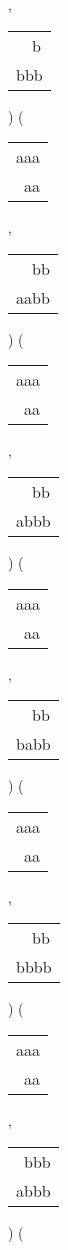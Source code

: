 \begin{description}
 , 
\begin{tabular}{|l|} \hline
\ \ b \\
bbb \\
\hline
\end{tabular} 
) 
 ( 
\begin{tabular}{|l|} \hline
aaa \\
\ aa \\
\hline
\end{tabular} 
 , 
\begin{tabular}{|l|} \hline
\ \ bb \\
aabb \\
\hline
\end{tabular} 
) 
 ( 
\begin{tabular}{|l|} \hline
aaa \\
\ aa \\
\hline
\end{tabular} 
 , 
\begin{tabular}{|l|} \hline
\ \ bb \\
abbb \\
\hline
\end{tabular} 
) 
 ( 
\begin{tabular}{|l|} \hline
aaa \\
\ aa \\
\hline
\end{tabular} 
 , 
\begin{tabular}{|l|} \hline
\ \ bb \\
babb \\
\hline
\end{tabular} 
) 
 ( 
\begin{tabular}{|l|} \hline
aaa \\
\ aa \\
\hline
\end{tabular} 
 , 
\begin{tabular}{|l|} \hline
\ \ bb \\
bbbb \\
\hline
\end{tabular} 
) 
 ( 
\begin{tabular}{|l|} \hline
aaa \\
\ aa \\
\hline
\end{tabular} 
 , 
\begin{tabular}{|l|} \hline
\ bbb \\
abbb \\
\hline
\end{tabular} 
) 
 ( 
\begin{tabular}{|l|} \hline

\end{tabular}
\end{description}
